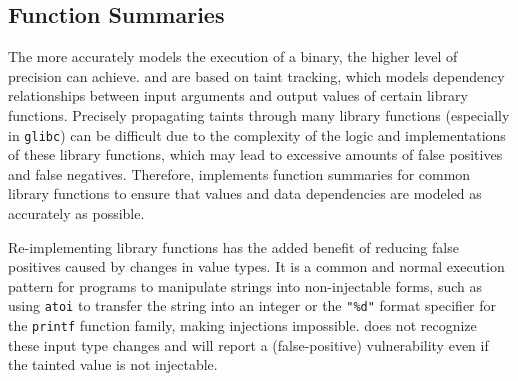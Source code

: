\subsection{Function Summaries}
\label{sec:function_handlers}

The more accurately \rda models the execution of a binary, the higher level of precision \mango can achieve.
\karonte and \satc are based on taint tracking, which models dependency relationships between input arguments and output values of certain library functions.
Precisely propagating taints through many library functions (especially in \texttt{glibc}) can be difficult due to the complexity of the logic and implementations of these library functions, which may lead to excessive amounts of false positives and false negatives.
Therefore, \mango implements function summaries for common library functions to ensure that values and data dependencies are modeled as accurately as possible.

Re-implementing library functions has the added benefit of reducing false positives caused by changes in value types.
It is a common and normal execution pattern for programs to manipulate strings into non-injectable forms, such as using \texttt{atoi} to transfer the string into an integer or the \texttt{"\%d"} format specifier for the \texttt{printf} function family, making injections impossible.
\satc does not recognize these input type changes and will report a (false-positive) vulnerability even if the tainted value is not injectable.
